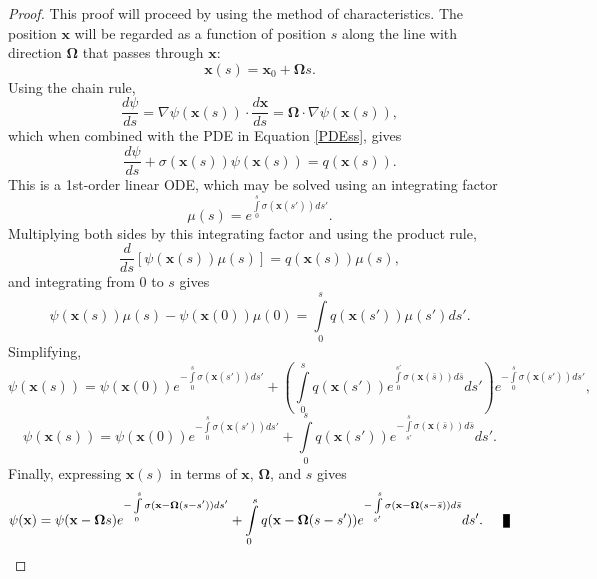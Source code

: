 \begin{proof}
   This proof will proceed by using the method of characteristics. The position
   $\mathbf{x}$ will be regarded as a function of position $s$ along the line
   with direction $\mathbf{\Omega}$ that passes through $\mathbf{x}$:
   \[
      \mathbf{x}(s) = \mathbf{x}_0 + \mathbf{\Omega}s.
   \]
   Using the chain rule,
   \[
      \frac{d\psi}{ds} = \nabla\psi(\mathbf{x}(s)) \cdot \frac{d\mathbf{x}}{ds}
         = \mathbf{\Omega} \cdot \nabla\psi(\mathbf{x}(s)),
   \]
   which when combined with the PDE in Equation \eqref{PDEss}, gives
   \[
      \frac{d\psi}{ds} + \sigma(\mathbf{x}(s))\psi(\mathbf{x}(s)) = q(\mathbf{x}(s)).
   \]
   This is a 1st-order linear ODE, which may be solved using an integrating factor
   \[
      \mu(s)=e^{\int\limits_0^s\sigma(\mathbf{x}(s'))ds'}.
   \]
   Multiplying both sides by this integrating factor and using the product rule,
   \[
      \frac{d}{ds}\left[\psi(\mathbf{x}(s))\mu(s)\right] = q(\mathbf{x}(s)) \mu(s),
   \]
   and integrating from $0$ to $s$ gives
   \[
      \psi(\mathbf{x}(s))\mu(s)-\psi(\mathbf{x}(0))\mu(0) =
         \int\limits_0^s q(\mathbf{x}(s')) \mu(s') ds'.
   \]
   Simplifying,
   \[
      \psi(\mathbf{x}(s)) = \psi(\mathbf{x}(0))
         e^{-\int\limits_0^s \sigma(\mathbf{x}(s'))ds'} +
         \left(\int\limits_0^s q(\mathbf{x}(s'))
         e^{\int\limits_0^{s'}\sigma(\mathbf{x}(\bar{s}))d\bar{s}} ds'\right)
         e^{-\int\limits_0^s\sigma(\mathbf{x}(s'))ds'},
   \]
   \[
      \psi(\mathbf{x}(s)) = \psi(\mathbf{x}(0))
         e^{-\int\limits_0^s \sigma(\mathbf{x}(s'))ds'} +
         \int\limits_0^s q(\mathbf{x}(s'))
         e^{-\int\limits_{s'}^s\sigma(\mathbf{x}(\bar{s}))d\bar{s}} ds'.
   \]
   Finally, expressing $\mathbf{x}(s)$ in terms of $\mathbf{x}$, $\mathbf{\Omega}$,
   and $s$ gives
   \[
      \psi(\mathbf{x}) = \psi(\mathbf{x} - \mathbf{\Omega}s)
         e^{-\int\limits_0^s \sigma(\mathbf{x} - \mathbf{\Omega}(s -s'))ds'} +
         \int\limits_0^s q(\mathbf{x} - \mathbf{\Omega}(s -s'))
         e^{-\int\limits_{s'}^s\sigma(\mathbf{x}
         - \mathbf{\Omega}(s -\bar{s}))d\bar{s}} ds'.\qed
   \]
\end{proof}

